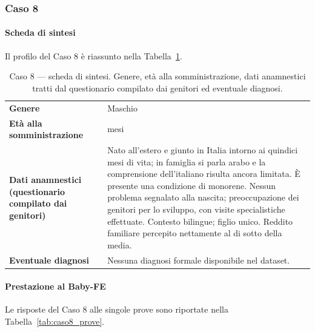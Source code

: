  \subsubsection*{Caso 8}

 \paragraph*{Scheda di sintesi}

Il profilo del Caso 8 è riassunto nella Tabella~\ref{tab:caso8_scheda}.

\begin{table}[htbp]
\centering
\caption[Caso 8 --- scheda di sintesi]{Caso 8 --- scheda di sintesi. Genere, età alla somministrazione, dati anamnestici tratti dal questionario compilato dai genitori ed eventuale diagnosi.}
\label{tab:caso8_scheda}
\begin{tabular}{|>{\raggedright\arraybackslash}p{4.3cm}|>{\raggedright\arraybackslash}p{9.2cm}|}
\toprule
\textbf{Genere} & Maschio \\
\textbf{Età alla somministrazione} & 29 mesi \\
\textbf{Dati anamnestici (questionario compilato dai genitori)} & Nato all'estero e giunto in Italia intorno ai quindici mesi di vita; in famiglia si parla arabo e la comprensione dell'italiano risulta ancora limitata. È presente una condizione di monorene. Nessun problema segnalato alla nascita; preoccupazione dei genitori per lo sviluppo, con visite specialistiche effettuate. Contesto bilingue; figlio unico. Reddito familiare percepito nettamente al di sotto della media. \\
\textbf{Eventuale diagnosi} & Nessuna diagnosi formale disponibile nel dataset. \\
\bottomrule
\end{tabular}
\end{table}

 \paragraph*{Prestazione al Baby-FE}

Le risposte del Caso 8 alle singole prove sono riportate nella Tabella~\ref{tab:caso8_prove}.

